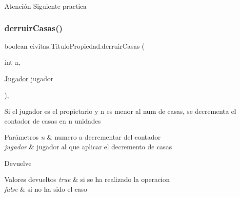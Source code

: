 \begin{DoxyWarning}{Atención}
Siguiente practica 
\end{DoxyWarning}
\mbox{\label{classcivitas_1_1TituloPropiedad_a61e1dfd0ba431e4ae30c459f93b0c343}} 
\subsubsection{\texorpdfstring{derruir\+Casas()}{derruirCasas()}}
{\footnotesize\ttfamily boolean civitas.\+Titulo\+Propiedad.\+derruir\+Casas (\begin{DoxyParamCaption}\item[{int}]{n,  }\item[{\hyperlink{classcivitas_1_1Jugador}{Jugador}}]{jugador }\end{DoxyParamCaption})\hspace{0.3cm}{\ttfamily [inline]}, {\ttfamily [package]}}

Si el jugador es el propietario y n es menor al num de casas, se decrementa el contador de casas en n unidades 
\begin{DoxyParams}{Parámetros}
{\em n} & numero a decrementar del contador \\
\hline
{\em jugador} & jugador al que aplicar el decremento de casas \\
\hline
\end{DoxyParams}
\begin{DoxyReturn}{Devuelve}

\end{DoxyReturn}

\begin{DoxyRetVals}{Valores devueltos}
{\em true} & si se ha realizado la operacion \\
\hline
{\em false} & si no ha sido el caso \\
\hline
\end{DoxyRetVals}
\mbox{\label{classcivitas_1_1TituloPropiedad_a90576263833e66db28713a4e5cc19a62}} 
